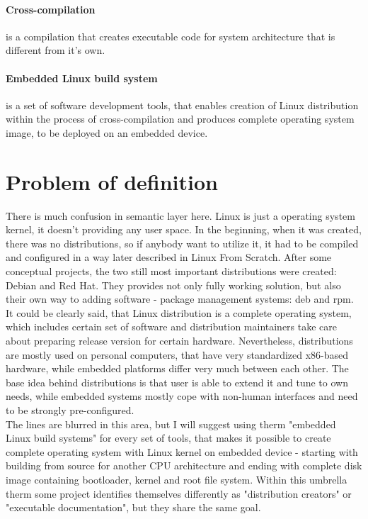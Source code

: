 \documentclass[printmode]{mgr}
\begin{document}
\paragraph{Cross-compilation} is a compilation that creates executable code for system architecture that is different from it's own.

\paragraph{Embedded Linux build system} is a set of software development tools, that enables creation of Linux distribution within the process of cross-compilation and produces complete operating system image, to be deployed on an embedded device.

\section{Problem of definition}
There is much confusion in semantic layer here. Linux is just a operating system kernel, it doesn't providing any user space.
In the beginning, when it was created, there was no distributions, so if anybody want to utilize it, it had to be compiled and configured in a way later described in Linux From Scratch. After some conceptual projects, the two still most important distributions were created: Debian and Red Hat. They provides not only fully working solution, but also their own way to adding software - package management systems: deb and rpm. \\
It could be clearly said, that Linux distribution is a complete operating system, which includes certain set of software and distribution maintainers take care about preparing release version for certain hardware. Nevertheless, distributions are mostly used on personal computers, that have very standardized x86-based hardware, while embedded platforms differ very much between each other. The base idea behind distributions is that user is able to extend it and tune to own needs, while embedded systems mostly cope with non-human interfaces and need to be strongly pre-configured. \\
The lines are blurred in this area, but I will suggest using therm "embedded Linux build systems" for every set of tools, that makes it possible to create complete operating system with Linux kernel on embedded device - starting with building from source for another CPU architecture and ending with complete disk image containing bootloader, kernel and root file system. Within this umbrella therm some project identifies themselves differently as "distribution creators" or "executable documentation", but they share the same goal.
\end{document}
